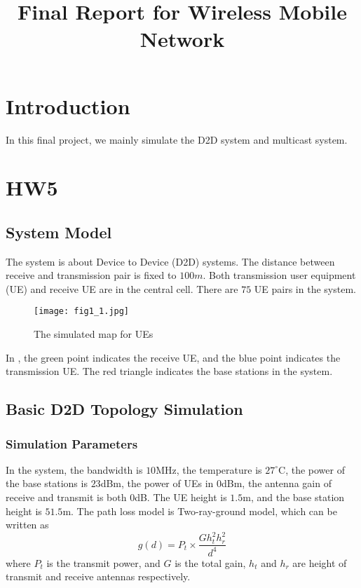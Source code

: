 \documentclass[conference]{IEEEtran}
\begin{document}
\title{Final Report for Wireless Mobile Network}
\author{
}
\maketitle

\section{Introduction}
In this final project, we mainly simulate the D2D system and multicast system.
\section{HW5}
\subsection{System Model}
The system is about Device to Device (D2D) systems. The distance between receive and transmission pair is fixed to $100m$. Both transmission user equipment (UE) and receive UE are in the central cell. There are $75$ UE pairs in the system.
\begin{figure}[htbp]
    \centering
    \texttt{[image: fig1\_1.jpg]}
    \caption{The simulated map for UEs}
    \label{fig:ue_map}
\end{figure}


In , the green point indicates the receive UE, and the blue point indicates the transmission UE. The red triangle indicates the base stations in the system.
\subsection{Basic D2D Topology Simulation}
\subsubsection{Simulation Parameters}
In the system, the bandwidth is $10$MHz, the temperature is $27^\circ$C, the power of the base stations is $23$dBm, the power of UEs in $0$dBm, the antenna gain of receive and transmit is both $0$dB. The UE height is $1.5$m, and the base station height is $51.5$m. The path loss model is Two-ray-ground model, which can be written as
\begin{equation}\label{eqn:two_ray}
    g(d) = P_t \times \dfrac{Gh_t^2h_r^2}{d^4}
\end{equation}
where $P_t$ is the transmit power, and $G$ is the total gain, $h_t$ and $h_r$ are height of transmit and receive antennas respectively.
\end{document}
